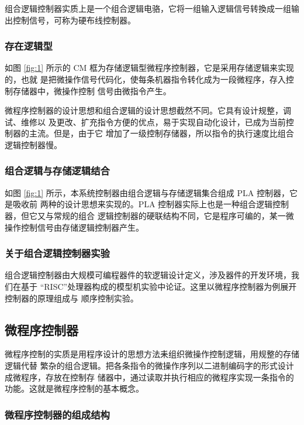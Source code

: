 \documentclass[a4paper,10pt,UTF8]{paper}
\numberwithin{equation}{section}
\numberwithin{figure}{section}
\begin{document}
组合逻辑控制器实质上是一个组合逻辑电骆，它将一组输入逻辑信号转換成一组输出控制信号，可称为硬布线控制器。

\subsubsection{存在逻辑型}

如图 \ref{fig:1} 所示的 CM 框为存储逻辑型微程序控制器，它是采用存储逻辑来实现的，也就
是把微操作信号代码化，使每条机器指令转化成为一段微程序，存入控制存储器中，微操作控制
信号由微指令产生。

微程序控制器的设计思想和组合逻辑的设计思想截然不同。它具有设计规整，调试、维修以
及更改、扩充指令方便的优点，易于实现自动化设计，已成为当前控制器的主流。但是，由于它
增加了一级控制存储器，所以指令的执行速度比组合逻辑控制器慢。

\subsubsection{组合逻辑与存储逻辑结合}

如图 \ref{fig:1} 所示，本系统控制器由组合逻辑与存储逻辑集合组成 PLA 控制器，它是吸收前
两种的设计思想来实现的。PLA 控制器实际上也是一种组合逻辑控制器，但它又与常规的组合
逻辑控制器的硬联结构不同，它是程序可编的，某一微操作控制信号由存储逻辑控制器产生。

\subsubsection{关于组合逻辑控制器实验}

组合逻辑控制器由大规模可编程器件的软逻辑设计定义，渉及器件的开发环境，我们在基于
“RISC”处理器构成的模型机实验中论证。这里以微程序控制器为例展开控制器的原理组成与
顺序控制实验。

\subsection{微程序控制器}

微程序控制的实质是用程序设计的思想方法耒组织微操作控制逻辑，用规整的存储逻辑代替
繁杂的组合逻辑。把各条指令的微操作序列以二进制编码字的形式设计成微程序，存放在控制存
储器中，通过读取并执行相应的微程序实现一条指令的功能。这就是微程序控制的基本概念。



\subsubsection{微程序控制器的组成结构}
\end{document}
